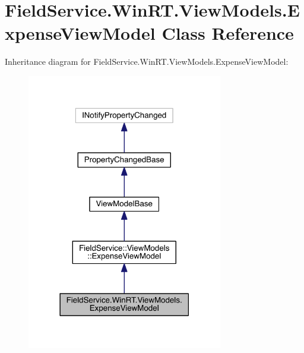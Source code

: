 \hypertarget{class_field_service_1_1_win_r_t_1_1_view_models_1_1_expense_view_model}{\section{Field\+Service.\+Win\+R\+T.\+View\+Models.\+Expense\+View\+Model Class Reference}
\label{class_field_service_1_1_win_r_t_1_1_view_models_1_1_expense_view_model}
}


Inheritance diagram for Field\+Service.\+Win\+R\+T.\+View\+Models.\+Expense\+View\+Model\+:
\nopagebreak
\begin{figure}[H]
\begin{center}
\leavevmode
\includegraphics[width=242pt]{class_field_service_1_1_win_r_t_1_1_view_models_1_1_expense_view_model__inherit__graph}
\end{center}
\end{figure}


